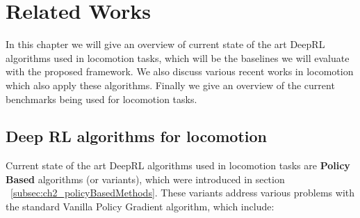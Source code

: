 

\chapter{Related Works}
\label{ch:relatedWorks}




In this chapter we will give an overview of current state of the art DeepRL algorithms
used in locomotion tasks, which will be the baselines we will evaluate with the proposed
framework. We also discuss various recent works in locomotion which also apply 
these algorithms. Finally we give an overview of the current benchmarks being
used for locomotion tasks.

\section{Deep RL algorithms for locomotion} \label{sec:ch3_deeprl_algorithms}

Current state of the art DeepRL algorithms used in locomotion tasks are \textbf{Policy Based} 
algorithms (or variants), which were introduced in section ~\ref{subsec:ch2_policyBasedMethods}. 
These variants address various problems with the standard Vanilla Policy Gradient algorithm,
which include:


